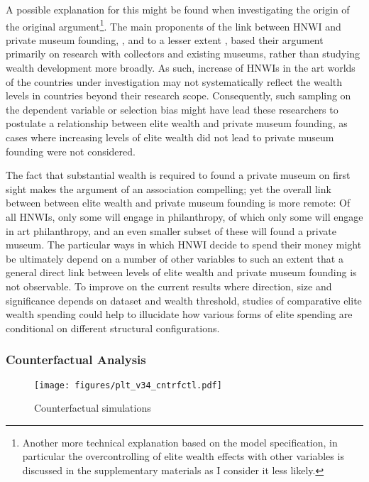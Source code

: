 \documentclass[11pt, authoryear]{elsarticle}
\begin{document}
A possible explanation for this might be found when investigating the origin of the original argument\footnote{Another more technical explanation based on the model specification, in particular the overcontrolling of elite wealth effects with other variables is discussed in the supplementary materials as I consider it less likely.}.
The main proponents of the link between HNWI and private museum founding, \citet{Gnyp_2015_collectors}, \citet{Zorloni_Resch_2016_opportunities} and to a lesser extent \citet{Walker_2019_collector}, based their argument primarily on research with collectors and existing museums, rather than studying wealth development more broadly.
As such, increase of HNWIs in the art worlds of the countries under investigation may not systematically reflect the wealth levels in countries beyond their research scope.  
Consequently, such sampling on the dependent variable or selection bias might have lead these researchers to postulate a relationship between elite wealth and private museum founding, as cases where increasing levels of elite wealth did not lead to private museum founding were not considered. 


The fact that substantial wealth is required to found a private museum on first sight makes the argument of an association compelling; yet the overall link between between elite wealth and private museum founding is more remote: 
Of all HNWIs, only some will engage in philanthropy, of which only some will engage in art philanthropy, and  an even smaller subset of these will found a private museum.
The particular ways in which HNWI decide to spend their money might be ultimately depend on a number of other variables to such an extent that a general direct link between levels of elite wealth and private museum founding is not observable.
To improve on the current results where direction, size and significance depends on dataset and wealth threshold, studies of comparative elite wealth spending could help to illucidate how various forms of elite spending are conditional on different structural configurations.








\subsubsection*{Counterfactual Analysis}

\begin{figure}[htbp]
\centering
\texttt{[image: figures/plt\_v34\_cntrfctl.pdf]}
\caption{\label{fig:cntrfctl}Counterfactual simulations}
\end{figure}
\end{document}
